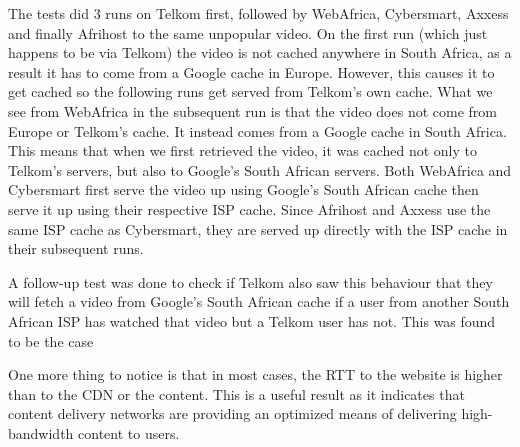 \documentclass{sig-alternate-05-2015}
\begin{document}
\begin{table*}
	\centering
	\caption{Organisation managing IP to unpopular YouTube video}
	\label{table:OrgHostingUnpopularYouTubeVideo}
	\end{table*}

The tests did 3 runs on Telkom first, followed by WebAfrica, Cybersmart, Axxess and finally Afrihost to the same unpopular video. On the first run (which just happens to be via Telkom) the video is not cached anywhere in South Africa, as a result it has to come from a Google cache in Europe. However, this causes it to get cached so the following runs get served from Telkom's own cache. What we see from WebAfrica in the subsequent run is that the video does not come from Europe or Telkom's cache. It instead comes from a Google cache in South Africa. This means that when we first retrieved the video, it was cached not only to Telkom's servers, but also to Google's South African servers. Both WebAfrica and Cybersmart first serve the video up using Google's South African cache then serve it up using their respective ISP cache. Since Afrihost and Axxess use the same ISP cache as Cybersmart, they are served up directly with the ISP cache in their subsequent runs. 

A follow-up test was done to check if Telkom also saw this behaviour that they will fetch a video from Google's South African cache if a user from another South African ISP has watched that video but a Telkom user has not. This was found to be the case

One more thing to notice is that in most cases, the RTT to the website is higher than to the CDN or the content. This is a useful result as it indicates that content delivery networks are providing an optimized means of delivering high-bandwidth content to users.
\end{document}
